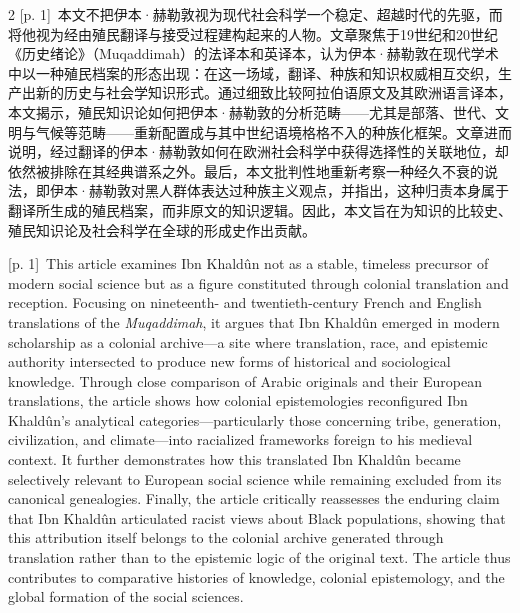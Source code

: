 \documentclass[10pt,a4paper]{article}
\begin{document}
\begin{paracol}{2}
{\scriptsize\color{gray} [p. 1]}\ 本文不把伊本·赫勒敦视为现代社会科学一个稳定、超越时代的先驱，而将他视为经由殖民翻译与接受过程建构起来的人物。文章聚焦于19世纪和20世纪《历史绪论》（Muqaddimah）的法译本和英译本，认为伊本·赫勒敦在现代学术中以一种殖民档案的形态出现：在这一场域，翻译、种族和知识权威相互交织，生产出新的历史与社会学知识形式。通过细致比较阿拉伯语原文及其欧洲语言译本，本文揭示，殖民知识论如何把伊本·赫勒敦的分析范畴——尤其是部落、世代、文明与气候等范畴——重新配置成与其中世纪语境格格不入的种族化框架。文章进而说明，经过翻译的伊本·赫勒敦如何在欧洲社会科学中获得选择性的关联地位，却依然被排除在其经典谱系之外。最后，本文批判性地重新考察一种经久不衰的说法，即伊本·赫勒敦对黑人群体表达过种族主义观点，并指出，这种归责本身属于翻译所生成的殖民档案，而非原文的知识逻辑。因此，本文旨在为知识的比较史、殖民知识论及社会科学在全球的形成史作出贡献。\par
\switchcolumn
{\scriptsize\color{gray} [p. 1]}\ This article examines Ibn Khaldûn not as a stable, timeless precursor of modern social science but as a figure constituted through colonial translation and reception. Focusing on nineteenth- and twentieth-century French and English translations of the \textit{Muqaddimah}, it argues that Ibn Khaldûn emerged in modern scholarship as a colonial archive—a site where translation, race, and epistemic authority intersected to produce new forms of historical and sociological knowledge. Through close comparison of Arabic originals and their European translations, the article shows how colonial epistemologies reconfigured Ibn Khaldûn’s analytical categories—particularly those concerning tribe, generation, civilization, and climate—into racialized frameworks foreign to his medieval context. It further demonstrates how this translated Ibn Khaldûn became selectively relevant to European social science while remaining excluded from its canonical genealogies. Finally, the article critically reassesses the enduring claim that Ibn Khaldûn articulated racist views about Black populations, showing that this attribution itself belongs to the colonial archive generated through translation rather than to the epistemic logic of the original text. The article thus contributes to comparative histories of knowledge, colonial epistemology, and the global formation of the social sciences.\par
\switchcolumn*

\end{paracol}
\end{document}

